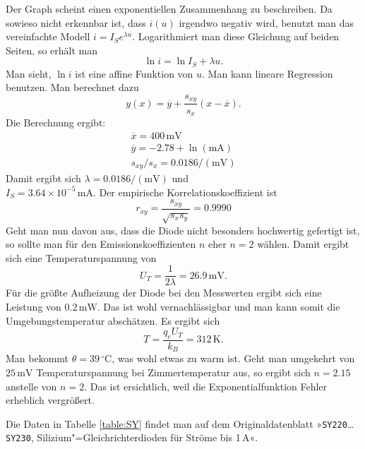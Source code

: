 \documentclass[a4paper,10pt,fleqn,twocolumn,twoside]{scrartcl}
\numberwithin{equation}{section}
\begin{document}
\noindent
Der Graph scheint einen exponentiellen Zusammenhang zu
beschreiben. Da sowieso nicht erkennbar ist, dass $i(u)$ irgendwo
negativ wird, benutzt man das vereinfachte Modell
$i=I_Se^{\lambda u}$. Logarithmiert man diese Gleichung auf
beiden Seiten, so erhält man%
\begin{equation}
\ln i = \ln I_S + \lambda u.
\end{equation}
Man sieht, $\ln i$ ist eine affine Funktion von $u$. Man kann lineare
Regression benutzen. Man berechnet dazu%
\begin{equation}
y(x) = \overline y+\frac{s_{xy}}{s_x}(x-\overline x).
\end{equation}
Die Berechnung ergibt:
\begin{gather*}
\overline x = 400\,\mathrm{mV}\\
\overline y = -2.78+\ln(\mathrm{mA})\\
s_{xy}/s_x = 0.0186/(\mathrm{mV})
\end{gather*}
Damit ergibt sich $\lambda = 0.0186/(\mathrm{mV})$ und\\
$I_S=3.64\times 10^{-5}\,\mathrm{mA}$.
Der empirische Korrelationskoeffizient ist%
\begin{equation}
r_{xy} = \frac{s_{xy}}{\sqrt{s_x s_y}} = 0.9990
\end{equation}
Geht man nun davon aus, dass die Diode nicht besonders hochwertig
gefertigt ist, so sollte man für den Emissionskoeffizienten $n$
eher $n=2$ wählen. Damit ergibt sich eine Temperaturspannung von%
\begin{equation}
U_T = \frac{1}{2\lambda} = 26.9\,\mathrm{mV}.
\end{equation}
Für die größte Aufheizung der Diode bei den Messwerten ergibt
sich eine Leistung von $0.2\,\mathrm{mW}$. Das ist wohl
vernachlässigbar und man kann somit die Umgebungstemperatur
abschätzen. Es ergibt sich%
\begin{equation}
T = \frac{q_e U_T}{k_B} = 312\,\mathrm{K}.
\end{equation}
Man bekommt $\theta = 39\,\mathrm{{}^\circ C}$, was wohl etwas
zu warm ist. Geht man umgekehrt von $25\,\mathrm{mV}$
Temperaturspannung bei Zimmertemperatur aus, so ergibt
sich $n=2.15$ anstelle von $n=2$. Das ist ersichtlich, weil
die Exponentialfunktion Fehler erheblich vergrößert.

Die Daten in Tabelle \ref{table:SY} findet man auf dem
Originaldatenblatt »\texttt{SY220}{\ldots}\texttt{SY230},
Silizium"=Gleichrichterdioden für Ströme bis 1\,A«.
\end{document}
